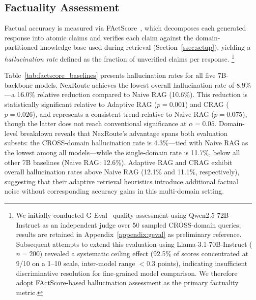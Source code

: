 
\subsection{Factuality Assessment}
\label{sec:factuality}

Factual accuracy is measured via FActScore~\cite{min2023factscore}, which
decomposes each generated response into atomic claims and verifies each claim
against the domain-partitioned knowledge base used during retrieval
(Section~\ref{ssec:setup}), yielding a \emph{hallucination rate} defined
as the fraction of unverified claims per response.%
\footnote{%
  We initially conducted G-Eval~\cite{liu2023geval} quality assessment using
  Qwen2.5-72B-Instruct as an independent judge over 50 sampled CROSS-domain
  queries; results are retained in Appendix~\ref{appendix:geval} as
  preliminary reference.
  Subsequent attempts to extend this evaluation using
  Llama-3.1-70B-Instruct ($n{=}200$) revealed a systematic ceiling effect
  (92.5\% of scores concentrated at 9/10 on a 1--10 scale,
  inter-model range $<$0.3 points), indicating insufficient discriminative
  resolution for fine-grained model comparison.
  We therefore adopt FActScore-based hallucination assessment as the primary
  factuality metric.
}

Table~\ref{tab:factscore_baselines} presents hallucination rates for all five
7B-backbone models.
NexRoute achieves the lowest overall hallucination rate of 8.9\%---a 16.0\%
relative reduction compared to Naive RAG (10.6\%).
This reduction is statistically significant relative to Adaptive RAG
($p{=}0.001$) and CRAG ($p{=}0.026$), and represents a consistent trend
relative to Naive RAG ($p{=}0.075$), though the latter does not reach
conventional significance at $\alpha{=}0.05$.
Domain-level breakdown reveals that NexRoute's advantage spans both evaluation
subsets: the CROSS-domain hallucination rate is 4.3\%---tied with Naive RAG
as the lowest among all models---while the single-domain rate is 11.7\%,
below all other 7B baselines (Naive RAG: 12.6\%).
Adaptive RAG and CRAG exhibit overall hallucination rates above Naive RAG
(12.1\% and 11.1\%, respectively), suggesting that their adaptive retrieval
heuristics introduce additional factual noise without corresponding accuracy
gains in this multi-domain setting.

